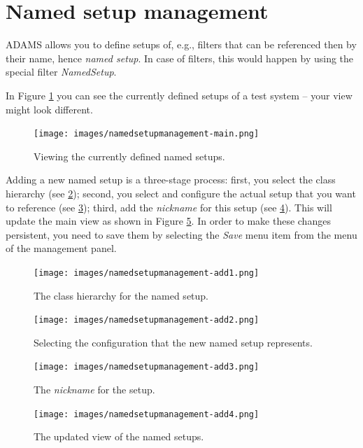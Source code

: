 \clearpage
\newpage
\section{Named setup management}
ADAMS allows you to define setups of, e.g., filters that can be referenced 
then by their name, hence \textit{named setup}. In case of filters, this would 
happen by using the special filter \textit{NamedSetup}. 

In Figure \ref{namedsetupmanagement-main} you can see the currently defined
setups of a test system -- your view might look different.

\begin{figure}[htb]
  \centering
  \texttt{[image: images/namedsetupmanagement-main.png]}
  \caption{Viewing the currently defined named setups.}
  \label{namedsetupmanagement-main}
\end{figure}

Adding a new named setup is a three-stage process: first, you select the
class hierarchy (see \ref{namedsetupmanagement-add1}); second, you select and
configure the actual setup that you want to reference (see 
\ref{namedsetupmanagement-add2}); third, add the \textit{nickname} for 
this setup (see \ref{namedsetupmanagement-add3}). This will update the main
view as shown in Figure \ref{namedsetupmanagement-add4}. In order to make these
changes persistent, you need to save them by selecting the \textit{Save} menu 
item from the menu of the management panel.

\begin{figure}[htb]
  \centering
  \texttt{[image: images/namedsetupmanagement-add1.png]}
  \caption{The class hierarchy for the named setup.}
  \label{namedsetupmanagement-add1}
\end{figure}

\begin{figure}[htb]
  \centering
  \texttt{[image: images/namedsetupmanagement-add2.png]}
  \caption{Selecting the configuration that the new named setup represents.}
  \label{namedsetupmanagement-add2}
\end{figure}

\begin{figure}[htb]
  \centering
  \texttt{[image: images/namedsetupmanagement-add3.png]}
  \caption{The \textit{nickname} for the setup.}
  \label{namedsetupmanagement-add3}
\end{figure}

\begin{figure}[htb]
  \centering
  \texttt{[image: images/namedsetupmanagement-add4.png]}
  \caption{The updated view of the named setups.}
  \label{namedsetupmanagement-add4}
\end{figure}

